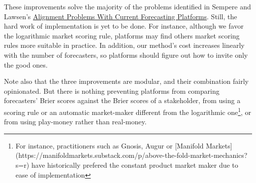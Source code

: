 \documentclass[]{article}
\begin{document}
These improvements solve the majority of the problems identified in
Sempere and Lawsen's \href{https://arxiv.org/abs/2106.11248}{Alignment
Problems With Current Forecasting Platforms}. Still, the hard work of
implementation is yet to be done. For instance, although we favor the
logarithmic market scoring rule, platforms may find others market
scoring rules more suitable in practice. In addition, our method's cost
increases linearly with the number of forecasters, so platforms should
figure out how to invite only the good ones.

Note also that the three improvements are modular, and their combination
fairly opinionated. But there is nothing preventing platforms from
comparing forecasters' Brier scores against the Brier scores of a
stakeholder, from using a scoring rule or an automatic market-maker
different from the logarithmic
one\footnote{For instance, practitioners such as Gnosis, Augur or [Manifold Markets](https://manifoldmarkets.substack.com/p/above-the-fold-market-mechanics?s=r) have historically prefered the constant product market maker due to ease of implementation},
or from using play-money rather than real-money.
\end{document}
